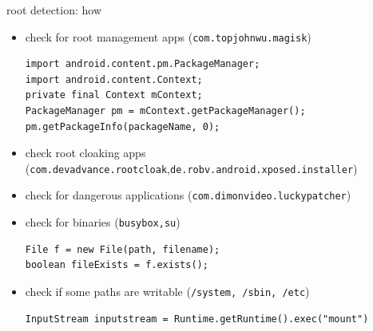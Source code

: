 \documentclass{beamer}
\begin{document}



\begin{frame}[fragile]{root detection: how}

    \begin{itemize}[]
        \item check for root management apps (\texttt{com.topjohnwu.magisk})
              \begin{verbatim}
import android.content.pm.PackageManager;
import android.content.Context;
private final Context mContext;
PackageManager pm = mContext.getPackageManager();
pm.getPackageInfo(packageName, 0);
\end{verbatim}
        \item check root cloaking apps {\small (\texttt{com.devadvance.rootcloak},\texttt{de.robv.android.xposed.installer})}
        \item check for dangerous applications (\texttt{com.dimonvideo.luckypatcher})
        \item check for binaries (\texttt{busybox,su})
              \begin{verbatim}
File f = new File(path, filename);
boolean fileExists = f.exists();
\end{verbatim}
        \item check if some paths are writable (\texttt{/system, /sbin, /etc})
              \begin{verbatim}
InputStream inputstream = Runtime.getRuntime().exec("mount")
\end{verbatim}
    \end{itemize}

\end{frame}
\end{document}
